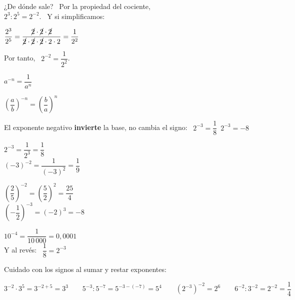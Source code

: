 \documentclass[11pt,a4paper]{article}
\newcommand{\be}[1]{{\color{fmok}\faCheckCircle}\ \ensuremath{#1}}
\newcommand{\mal}[1]{{\color{fmR}\faTimesCircle}\ {\color{fmR}\ensuremath{#1}}}
\begin{document}
\begin{minipage}[c]{0.5\linewidth}
¿De dónde sale? \ Por la propiedad del cociente,\\ $2^{3}:2^{5}=2^{-2}$. \ Y si simplificamos:\par\smallskip
{\centering$\dfrac{2^{3}}{2^{5}}=\dfrac{\cancel{2}\cdot\cancel{2}\cdot\cancel{2}}{\cancel{2}\cdot\cancel{2}\cdot\cancel{2}\cdot2\cdot2}=\dfrac{1}{2^{2}}$\par}\smallskip
Por tanto, \ $2^{-2}=\dfrac{1}{2^{2}}$.
\end{minipage}\hfill
\begin{minipage}[c]{0.46\linewidth}
\begin{tcolorbox}[enhanced,colback=fmyellow!18,colframe=fmgold,arc=4mm,boxrule=1.6pt,before upper=\centering,top=3mm,bottom=3mm]
{\Large$a^{-n}=\dfrac{1}{a^{n}}$}\par\medskip
{\Large$\left(\dfrac{a}{b}\right)^{-n}=\left(\dfrac{b}{a}\right)^{n}$}
\end{tcolorbox}
\end{minipage}

\begin{compte}
El exponente negativo \textbf{invierte} la base, no cambia el signo: \qquad \be{2^{-3}=\dfrac18}\qquad \mal{2^{-3}=-8}
\end{compte}

\begin{exemple}[Ejemplos]
\begin{minipage}[t]{0.32\linewidth}
$2^{-3}=\dfrac{1}{2^{3}}=\dfrac18$\\[5pt]
$(-3)^{-2}=\dfrac{1}{(-3)^{2}}=\dfrac19$
\end{minipage}\hfill
\begin{minipage}[t]{0.32\linewidth}
$\left(\dfrac25\right)^{-2}=\left(\dfrac52\right)^{2}=\dfrac{25}{4}$\\[5pt]
$\left(-\dfrac12\right)^{-3}=(-2)^{3}=-8$
\end{minipage}\hfill
\begin{minipage}[t]{0.32\linewidth}
$10^{-4}=\dfrac{1}{10\,000}=0{,}0001$\\[5pt]
Y al revés: \ $\dfrac18=2^{-3}$
\end{minipage}
\end{exemple}

\begin{idea}
Cuidado con los signos al sumar y restar exponentes:\\[4pt]
{\centering$3^{-2}\cdot3^{5}=3^{-2+5}=3^{3}\qquad 5^{-3}:5^{-7}=5^{-3-(-7)}=5^{4}\qquad \left(2^{-3}\right)^{-2}=2^{6}\qquad 6^{-2}:3^{-2}=2^{-2}=\dfrac14$\par}
\end{idea}
\end{document}
